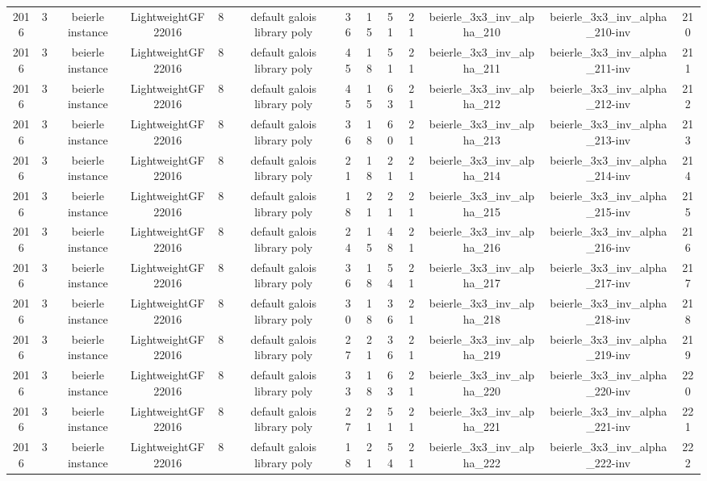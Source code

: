 \begin{tabular}{c c c c c c c c c c c c c}
2016 & 3 & beierle instance & LightweightGF22016 & 8 & default galois library poly & 36 & 15 & 51 & 21 & beierle_3x3_inv_alpha_210 & beierle_3x3_inv_alpha_210-inv & 210 \\
2016 & 3 & beierle instance & LightweightGF22016 & 8 & default galois library poly & 45 & 18 & 51 & 21 & beierle_3x3_inv_alpha_211 & beierle_3x3_inv_alpha_211-inv & 211 \\
2016 & 3 & beierle instance & LightweightGF22016 & 8 & default galois library poly & 45 & 15 & 63 & 21 & beierle_3x3_inv_alpha_212 & beierle_3x3_inv_alpha_212-inv & 212 \\
2016 & 3 & beierle instance & LightweightGF22016 & 8 & default galois library poly & 36 & 18 & 60 & 21 & beierle_3x3_inv_alpha_213 & beierle_3x3_inv_alpha_213-inv & 213 \\
2016 & 3 & beierle instance & LightweightGF22016 & 8 & default galois library poly & 21 & 18 & 21 & 21 & beierle_3x3_inv_alpha_214 & beierle_3x3_inv_alpha_214-inv & 214 \\
2016 & 3 & beierle instance & LightweightGF22016 & 8 & default galois library poly & 18 & 21 & 21 & 21 & beierle_3x3_inv_alpha_215 & beierle_3x3_inv_alpha_215-inv & 215 \\
2016 & 3 & beierle instance & LightweightGF22016 & 8 & default galois library poly & 24 & 15 & 48 & 21 & beierle_3x3_inv_alpha_216 & beierle_3x3_inv_alpha_216-inv & 216 \\
2016 & 3 & beierle instance & LightweightGF22016 & 8 & default galois library poly & 36 & 18 & 54 & 21 & beierle_3x3_inv_alpha_217 & beierle_3x3_inv_alpha_217-inv & 217 \\
2016 & 3 & beierle instance & LightweightGF22016 & 8 & default galois library poly & 30 & 18 & 36 & 21 & beierle_3x3_inv_alpha_218 & beierle_3x3_inv_alpha_218-inv & 218 \\
2016 & 3 & beierle instance & LightweightGF22016 & 8 & default galois library poly & 27 & 21 & 36 & 21 & beierle_3x3_inv_alpha_219 & beierle_3x3_inv_alpha_219-inv & 219 \\
2016 & 3 & beierle instance & LightweightGF22016 & 8 & default galois library poly & 33 & 18 & 63 & 21 & beierle_3x3_inv_alpha_220 & beierle_3x3_inv_alpha_220-inv & 220 \\
2016 & 3 & beierle instance & LightweightGF22016 & 8 & default galois library poly & 27 & 21 & 51 & 21 & beierle_3x3_inv_alpha_221 & beierle_3x3_inv_alpha_221-inv & 221 \\
2016 & 3 & beierle instance & LightweightGF22016 & 8 & default galois library poly & 18 & 21 & 54 & 21 & beierle_3x3_inv_alpha_222 & beierle_3x3_inv_alpha_222-inv & 222 \\

\end{tabular}
